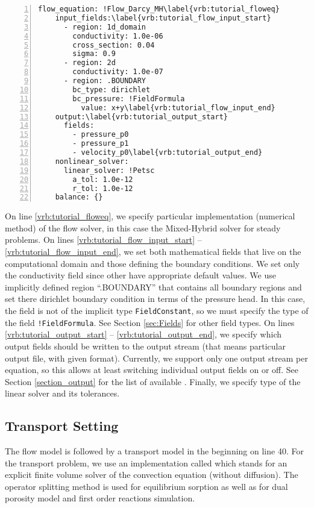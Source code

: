 \begin{Verbatim}[numbers=left, firstnumber=last,commandchars=\\\{\}]
  flow_equation: !Flow_Darcy_MH\label{vrb:tutorial_floweq}
    input_fields:\label{vrb:tutorial_flow_input_start}
      - region: 1d_domain
        conductivity: 1.0e-06
        cross_section: 0.04
        sigma: 0.9
      - region: 2d
        conductivity: 1.0e-07
      - region: .BOUNDARY
        bc_type: dirichlet
        bc_pressure: !FieldFormula
          value: x+y\label{vrb:tutorial_flow_input_end}
    output:\label{vrb:tutorial_output_start}
      fields:
        - pressure_p0
        - pressure_p1
        - velocity_p0\label{vrb:tutorial_output_end}
    nonlinear_solver:
      linear_solver: !Petsc
        a_tol: 1.0e-12
        r_tol: 1.0e-12
    balance: {}
\end{Verbatim}
On line \ref{vrb:tutorial_floweq}, we specify particular implementation (numerical method) of the flow solver, in this case the Mixed-Hybrid
solver for steady problems. On lines \ref{vrb:tutorial_flow_input_start} -- \ref{vrb:tutorial_flow_input_end}, 
we set both mathematical fields that live on the computational domain 
and those defining the boundary conditions. We set only the conductivity field since other 
have appropriate default values.
We use implicitly defined region ``.BOUNDARY'' that contains all boundary regions and set there dirichlet boundary condition in terms of the 
pressure head. In this case, the field is not of the implicit type {\tt FieldConstant}, so we must specify the type of the field {\tt !FieldFormula}.
See Section \ref{sec:Fields} for other field types. 
On lines \ref{vrb:tutorial_output_start} -- \ref{vrb:tutorial_output_end}, we specify which output fields should be written to the output stream (that means particular output file, with given format).
Currently, we support only one output stream per equation, so this allows at least switching individual output fields on or off. 
See Section \ref{section_output} for the list of available .
Finally, we specify type of the linear solver and its tolerances.



\subsection{Transport Setting}
The flow model is followed by a transport model in the 
beginning on line 40. For the transport problem, we use an implementation called 
which stands for an explicit finite volume solver of the convection equation (without diffusion).
The operator splitting method is used for equilibrium sorption as well as for dual porosity model and 
first order reactions simulation.

